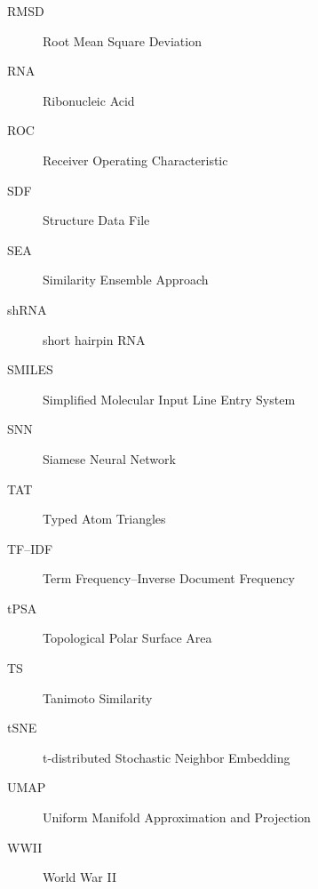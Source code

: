 \begin{description}
    \item[RMSD] Root Mean Square Deviation
    \item[RNA] Ribonucleic Acid
    \item[ROC] Receiver Operating Characteristic
    \item[SDF] Structure Data File
    \item[SEA] Similarity Ensemble Approach
    \item[shRNA] short hairpin RNA
    \item[SMILES] Simplified Molecular Input Line Entry System
    \item[SNN] Siamese Neural Network
    \item[TAT] Typed Atom Triangles
    \item[TF–IDF] Term Frequency–Inverse Document Frequency
    \item[tPSA] Topological Polar Surface Area
    \item[TS] Tanimoto Similarity
    \item[tSNE] t-distributed Stochastic Neighbor Embedding
    \item[UMAP] Uniform Manifold Approximation and Projection
    \item[WWII] World War II
\end{description}

